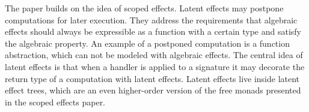 The paper  \autocite{latenteffects} builds on the idea of scoped effects. Latent effects may postpone computations for later execution. They address the requirements that algebraic effects should always be expressible as a function with a certain type and satisfy the algebraic property. An example of a postponed computation is a function abstraction, which can not be modeled with algebraic effects. The central idea of latent effects is that when a handler is applied to a signature it may decorate the return type of a computation with latent effects. Latent effects live inside latent effect trees, which are an even higher-order version of the free monads presented in the scoped effects paper.